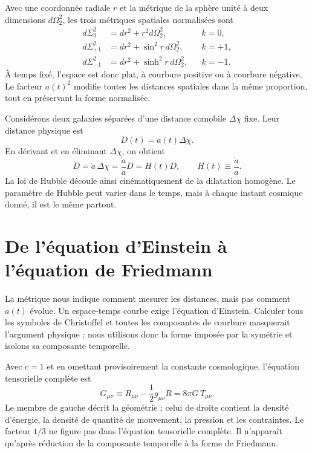 Avec une coordonnée radiale \(r\) et la métrique de la sphère unité à deux dimensions \(d\Omega_2^2\), les trois métriques spatiales normalisées sont
\begin{align}
d\Sigma_0^2 &= dr^2+r^2d\Omega_2^2,
&& k=0,
\label{eq:c04-flat-space}\\
d\Sigma_{+1}^2 &= dr^2+\sin^2 r\,d\Omega_2^2,
&& k=+1,
\label{eq:c04-spherical-space}\\
d\Sigma_{-1}^2 &= dr^2+\sinh^2 r\,d\Omega_2^2,
&& k=-1.
\label{eq:c04-hyperbolic-space}
\end{align}
À temps fixé, l’espace est donc plat, à courbure positive ou à courbure négative. Le facteur \(a(t)^2\) modifie toutes les distances spatiales dans la même proportion, tout en préservant la forme normalisée.

Considérons deux galaxies séparées d’une distance comobile \(\Delta\chi\) fixe. Leur distance physique est
\begin{equation}
D(t)=a(t)\Delta\chi.
\end{equation}
En dérivant et en éliminant \(\Delta\chi\), on obtient
\begin{equation}
\dot D=\dot a\,\Delta\chi
      =\frac{\dot a}{a}D
      =H(t)D,
\qquad
H(t)\equiv\frac{\dot a}{a}.
\label{eq:c04-hubble-law}
\end{equation}
La loi de Hubble découle ainsi cinématiquement de la dilatation homogène. Le paramètre de Hubble peut varier dans le temps, mais à chaque instant cosmique donné, il est le même partout.

\section{De l’équation d’Einstein à l’équation de Friedmann}

La métrique nous indique comment mesurer les distances, mais pas comment \(a(t)\) évolue. Un espace-temps courbe exige l’équation d’Einstein. Calculer tous les symboles de Christoffel et toutes les composantes de courbure masquerait l’argument physique ; nous utilisons donc la forme imposée par la symétrie et isolons sa composante temporelle.

Avec \(c=1\) et en omettant provisoirement la constante cosmologique, l’équation tensorielle complète est
\begin{equation}
G_{\mu\nu}
\equiv
R_{\mu\nu}-\frac12 g_{\mu\nu}R
=8\pi G\,T_{\mu\nu}.
\label{eq:c04-einstein}
\end{equation}
Le membre de gauche décrit la géométrie ; celui de droite contient la densité d’énergie, la densité de quantité de mouvement, la pression et les contraintes. Le facteur \(1/3\) ne figure pas dans l’équation tensorielle complète. Il n’apparaît qu’après réduction de la composante temporelle à la forme de Friedmann.

